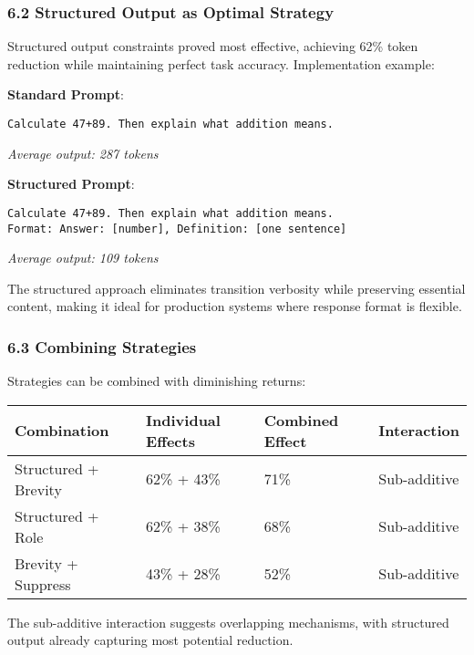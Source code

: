 \documentclass[
  11pt]{article}
\begin{document}
\subsubsection{6.2 Structured Output as Optimal
Strategy}\label{structured-output-as-optimal-strategy}

Structured output constraints proved most effective, achieving 62\%
token reduction while maintaining perfect task accuracy. Implementation
example:

\textbf{Standard Prompt}:

\begin{verbatim}
Calculate 47+89. Then explain what addition means.
\end{verbatim}

\emph{Average output: 287 tokens}

\textbf{Structured Prompt}:

\begin{verbatim}
Calculate 47+89. Then explain what addition means.
Format: Answer: [number], Definition: [one sentence]
\end{verbatim}

\emph{Average output: 109 tokens}

The structured approach eliminates transition verbosity while preserving
essential content, making it ideal for production systems where response
format is flexible.

\subsubsection{6.3 Combining Strategies}\label{combining-strategies}

Strategies can be combined with diminishing returns:

\begin{longtable}[]{@{}llll@{}}
\toprule\noalign{}
Combination & Individual Effects & Combined Effect & Interaction \\
\midrule\noalign{}
\endhead
\bottomrule\noalign{}
\endlastfoot
Structured + Brevity & 62\% + 43\% & 71\% & Sub-additive \\
Structured + Role & 62\% + 38\% & 68\% & Sub-additive \\
Brevity + Suppress & 43\% + 28\% & 52\% & Sub-additive \\
\end{longtable}

The sub-additive interaction suggests overlapping mechanisms, with
structured output already capturing most potential reduction.
\end{document}
